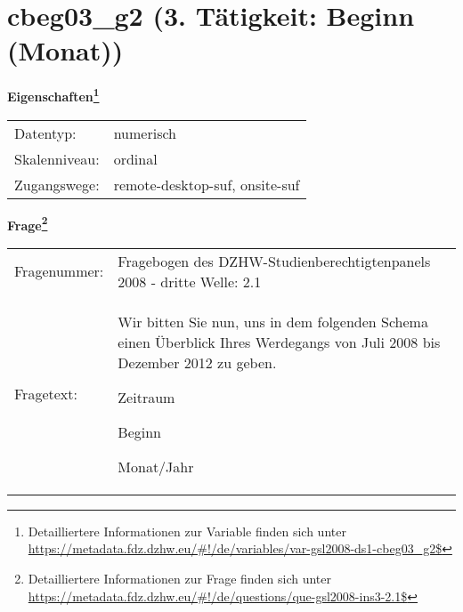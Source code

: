 
    \setcounter{footnote}{0}

    \vspace*{-1.8cm}
	\section{cbeg03\_g2 (3. Tätigkeit: Beginn (Monat))}
	\label{section:cbeg03_g2}



    \vspace*{0.5cm}
    \noindent\textbf{Eigenschaften\footnote{Detailliertere Informationen zur Variable finden sich unter
		\url{https://metadata.fdz.dzhw.eu/\#!/de/variables/var-gsl2008-ds1-cbeg03_g2$}}}\\
	\begin{tabularx}{\hsize}{@{}lX}
	Datentyp: & numerisch \\
	Skalenniveau: & ordinal \\
	Zugangswege: &
	  remote-desktop-suf, 
	  onsite-suf
 \\
    \end{tabularx}



				\vspace*{0.5cm}
                \noindent\textbf{Frage\footnote{Detailliertere Informationen zur Frage finden sich unter
		              \url{https://metadata.fdz.dzhw.eu/\#!/de/questions/que-gsl2008-ins3-2.1$}}}\\
				\begin{tabularx}{\hsize}{@{}lX}
					Fragenummer: &
					  Fragebogen des DZHW-Studienberechtigtenpanels 2008 - dritte Welle:
					  2.1
 \\
					Fragetext: & Wir bitten Sie nun, uns in dem folgenden Schema einen Überblick Ihres Werdegangs von Juli 2008 bis Dezember 2012 zu geben.\par  Zeitraum\par  Beginn\par  Monat/Jahr \\
				\end{tabularx}





